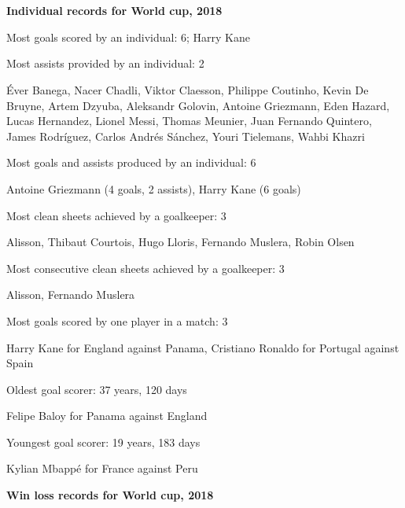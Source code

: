 \section*{}

\subsection*{}

\begin{questions}

\question \textbf{Individual records for World cup, 2018}

\begin{solution}

Most goals scored by an individual: 6; Harry Kane

Most assists provided by an individual: 2

Éver Banega, Nacer Chadli, Viktor Claesson, Philippe Coutinho, Kevin De Bruyne, Artem Dzyuba, Aleksandr Golovin, Antoine Griezmann, Eden Hazard, Lucas Hernandez, Lionel Messi, Thomas Meunier, Juan Fernando Quintero, James Rodríguez, Carlos Andrés Sánchez, Youri Tielemans, Wahbi Khazri

Most goals and assists produced by an individual: 6

Antoine Griezmann (4 goals, 2 assists), Harry Kane (6 goals)

Most clean sheets achieved by a goalkeeper: 3

Alisson, Thibaut Courtois, Hugo Lloris, Fernando Muslera, Robin Olsen

Most consecutive clean sheets achieved by a goalkeeper: 3

Alisson, Fernando Muslera

Most goals scored by one player in a match: 3

Harry Kane for England against Panama, Cristiano Ronaldo for Portugal against Spain

Oldest goal scorer: 37 years, 120 days

Felipe Baloy for Panama against England

Youngest goal scorer: 19 years, 183 days

Kylian Mbappé for France against Peru

\end{solution}

\question \textbf{Win loss records for World cup, 2018}


\end{questions}
